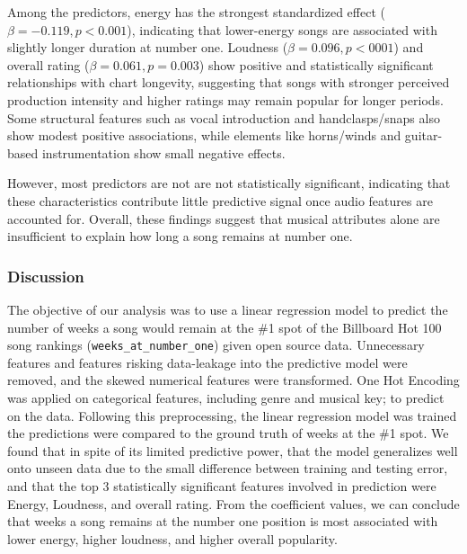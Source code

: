 \documentclass[
]{article}
\begin{document}
Among the predictors, energy has the strongest standardized effect
(\(\beta = -0.119, p < 0.001\)), indicating that lower-energy songs are
associated with slightly longer duration at number one. Loudness
(\(\beta = 0.096, p < 0001\)) and overall rating
(\(\beta = 0.061, p = 0.003\)) show positive and statistically
significant relationships with chart longevity, suggesting that songs
with stronger perceived production intensity and higher ratings may
remain popular for longer periods. Some structural features such as
vocal introduction and handclasps/snaps also show modest positive
associations, while elements like horns/winds and guitar-based
instrumentation show small negative effects.

However, most predictors are not are not statistically significant,
indicating that these characteristics contribute little predictive
signal once audio features are accounted for. Overall, these findings
suggest that musical attributes alone are insufficient to explain how
long a song remains at number one.

\subsubsection{Discussion}\label{discussion}

The objective of our analysis was to use a linear regression model to
predict the number of weeks a song would remain at the \#1 spot of the
Billboard Hot 100 song rankings (\texttt{weeks\_at\_number\_one}) given
open source data. Unnecessary features and features risking data-leakage
into the predictive model were removed, and the skewed numerical
features were transformed. One Hot Encoding was applied on categorical
features, including genre and musical key; to predict on the data.
Following this preprocessing, the linear regression model was trained
the predictions were compared to the ground truth of weeks at the \#1
spot. We found that in spite of its limited predictive power, that the
model generalizes well onto unseen data due to the small difference
between training and testing error, and that the top 3 statistically
significant features involved in prediction were Energy, Loudness, and
overall rating. From the coefficient values, we can conclude that weeks
a song remains at the number one position is most associated with lower
energy, higher loudness, and higher overall popularity.
\end{document}

